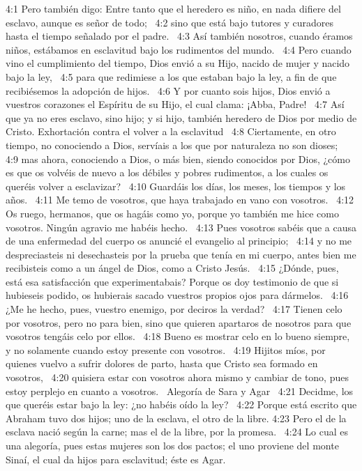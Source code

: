 4:1 Pero también digo: Entre tanto que el heredero es niño, en nada difiere del esclavo, aunque es señor de todo;  
4:2 sino que está bajo tutores y curadores hasta el tiempo señalado por el padre.  
4:3 Así también nosotros, cuando éramos niños, estábamos en esclavitud bajo los rudimentos del mundo.  
4:4 Pero cuando vino el cumplimiento del tiempo, Dios envió a su Hijo, nacido de mujer y nacido bajo la ley,  
4:5 para que redimiese a los que estaban bajo la ley, a fin de que recibiésemos la adopción de hijos.  
4:6 Y por cuanto sois hijos, Dios envió a vuestros corazones el Espíritu de su Hijo, el cual clama: ¡Abba, Padre!  
4:7 Así que ya no eres esclavo, sino hijo; y si hijo, también heredero de Dios por medio de Cristo. 
Exhortación contra el volver a la esclavitud  
4:8 Ciertamente, en otro tiempo, no conociendo a Dios, servíais a los que por naturaleza no son dioses;  
4:9 mas ahora, conociendo a Dios, o más bien, siendo conocidos por Dios, ¿cómo es que os volvéis de nuevo a los débiles y pobres rudimentos, a los cuales os queréis volver a esclavizar?  
4:10 Guardáis los días, los meses, los tiempos y los años.  
4:11 Me temo de vosotros, que haya trabajado en vano con vosotros.  
4:12 Os ruego, hermanos, que os hagáis como yo, porque yo también me hice como vosotros. Ningún agravio me habéis hecho.  
4:13 Pues vosotros sabéis que a causa de una enfermedad del cuerpo os anuncié el evangelio al principio;  
4:14 y no me despreciasteis ni desechasteis por la prueba que tenía en mi cuerpo, antes bien me recibisteis como a un ángel de Dios, como a Cristo Jesús.  
4:15 ¿Dónde, pues, está esa satisfacción que experimentabais? Porque os doy testimonio de que si hubieseis podido, os hubierais sacado vuestros propios ojos para dármelos.  
4:16 ¿Me he hecho, pues, vuestro enemigo, por deciros la verdad?  
4:17 Tienen celo por vosotros, pero no para bien, sino que quieren apartaros de nosotros para que vosotros tengáis celo por ellos.  
4:18 Bueno es mostrar celo en lo bueno siempre, y no solamente cuando estoy presente con vosotros.  
4:19 Hijitos míos, por quienes vuelvo a sufrir dolores de parto, hasta que Cristo sea formado en vosotros,  
4:20 quisiera estar con vosotros ahora mismo y cambiar de tono, pues estoy perplejo en cuanto a vosotros.  
Alegoría de Sara y Agar  
4:21 Decidme, los que queréis estar bajo la ley: ¿no habéis oído la ley?  
4:22 Porque está escrito que Abraham tuvo dos hijos; uno de la esclava, el otro de la libre. 
4:23 Pero el de la esclava nació según la carne; mas el de la libre, por la promesa.  
4:24 Lo cual es una alegoría, pues estas mujeres son los dos pactos; el uno proviene del monte Sinaí, el cual da hijos para esclavitud; éste es Agar.  
